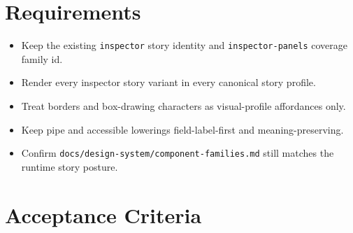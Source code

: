 \section{Requirements}\label{record-095-requirements}

\begin{itemize}
\tightlist
\item
  Keep the existing \texttt{i\allowbreak{}n\allowbreak{}s\allowbreak{}p\allowbreak{}e\allowbreak{}c\allowbreak{}t\allowbreak{}o\allowbreak{}r} story identity and \texttt{i\allowbreak{}n\allowbreak{}s\allowbreak{}p\allowbreak{}e\allowbreak{}c\allowbreak{}t\allowbreak{}o\allowbreak{}r\allowbreak{}-\allowbreak{}p\allowbreak{}a\allowbreak{}n\allowbreak{}e\allowbreak{}l\allowbreak{}s} coverage family id.
\item
  Render every inspector story variant in every canonical story profile.
\item
  Treat borders and box-drawing characters as visual-profile affordances only.
\item
  Keep pipe and accessible lowerings field-label-first and meaning-preserving.
\item
  Confirm \texttt{d\allowbreak{}o\allowbreak{}c\allowbreak{}s\allowbreak{}/\allowbreak{}d\allowbreak{}e\allowbreak{}s\allowbreak{}i\allowbreak{}g\allowbreak{}n\allowbreak{}-\allowbreak{}s\allowbreak{}y\allowbreak{}s\allowbreak{}t\allowbreak{}e\allowbreak{}m\allowbreak{}/\allowbreak{}c\allowbreak{}o\allowbreak{}m\allowbreak{}p\allowbreak{}o\allowbreak{}n\allowbreak{}e\allowbreak{}n\allowbreak{}t\allowbreak{}-\allowbreak{}f\allowbreak{}a\allowbreak{}m\allowbreak{}i\allowbreak{}l\allowbreak{}i\allowbreak{}e\allowbreak{}s\allowbreak{}.\allowbreak{}m\allowbreak{}d} still matches the runtime story posture.
\end{itemize}

\section{Acceptance Criteria}\label{record-095-acceptance-criteria}

